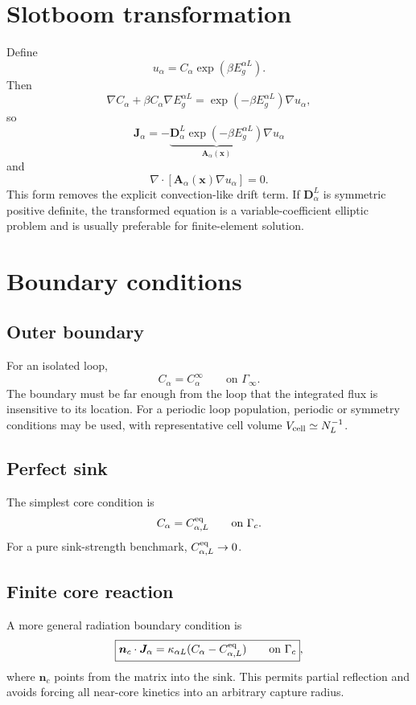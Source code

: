 \documentclass[11pt]{article}
\newcommand{\bJ}{\bm{J}}
\newcommand{\bD}{\bm{D}}
\newcommand{\bx}{\bm{x}}
\newcommand{\bn}{\bm{n}}
\newcommand{\cG}{\Gamma}
\begin{document}
\section{Slotboom transformation}
Define
\begin{equation}
u_\alpha=C_\alpha\exp(\beta E_g^{\alpha L}).
\end{equation}
Then
\begin{equation}
\nabla C_\alpha+\beta C_\alpha\nabla E_g^{\alpha L}
=\exp(-\beta E_g^{\alpha L})\nabla u_\alpha,
\end{equation}
so
\begin{equation}
\boxed{\bJ_\alpha=-\underbrace{\bD_\alpha^L\exp(-\beta E_g^{\alpha L})}_{\bm A_\alpha(\bx)}\nabla u_\alpha}
\end{equation}
and
\begin{equation}
\boxed{\nabla\cdot[\bm A_\alpha(\bx)\nabla u_\alpha]=0}.
\end{equation}
This form removes the explicit convection-like drift term. If $\bD_\alpha^L$ is symmetric positive definite, the transformed equation is a variable-coefficient elliptic problem and is usually preferable for finite-element solution.

\section{Boundary conditions}
\subsection{Outer boundary}
For an isolated loop,
\begin{equation}
C_\alpha=C_\alpha^\infty\qquad\text{on }\cG_\infty.
\end{equation}
The boundary must be far enough from the loop that the integrated flux is insensitive to its location. For a periodic loop population, periodic or symmetry conditions may be used, with representative cell volume $V_{\rm cell}\simeq N_L^{-1}$.

\subsection{Perfect sink}
The simplest core condition is
\begin{equation}
C_\alpha=C_{\alpha,L}^{\rm eq}\qquad\text{on }\cG_c.
\end{equation}
For a pure sink-strength benchmark, $C_{\alpha,L}^{\rm eq}\to0$.

\subsection{Finite core reaction}
A more general radiation boundary condition is
\begin{equation}
\boxed{\bn_c\cdot\bJ_\alpha=\kappa_{\alpha L}(C_\alpha-C_{\alpha,L}^{\rm eq})\qquad\text{on }\cG_c},
\end{equation}
where $\bn_c$ points from the matrix into the sink. This permits partial reflection and avoids forcing all near-core kinetics into an arbitrary capture radius.
\end{document}

